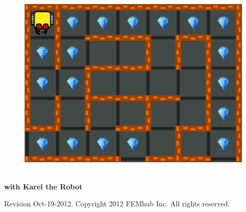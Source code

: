 \documentclass[article,A4,12pt]{llncs}
\newif\iffullversion
\begin{document}
\begin{figure}[!ht]
\begin{center}
\vspace{-6mm}
\includegraphics[width=0.26\textheight]{img/karel-logo.png}\ \ \ \ \ \ 
\vbox{}
\vspace{-9mm}
\end{center}
\end{figure}
\begin{center}
{\huge \bf with Karel the Robot}
\end{center}
\vbox{}
\vspace{5mm}
\begin{center}
\iffullversion
\else
\centerline{\huge \color{red}{PREVIEW}}
\fi
\vfill
\end{center}
\vfill
\vfill
\begin{center}
Revision Oct-19-2012. Copyright 2012 FEMhub Inc. All rights reserved.
\end{center}
\newpage
\vbox{}
\vfill
\end{document}
